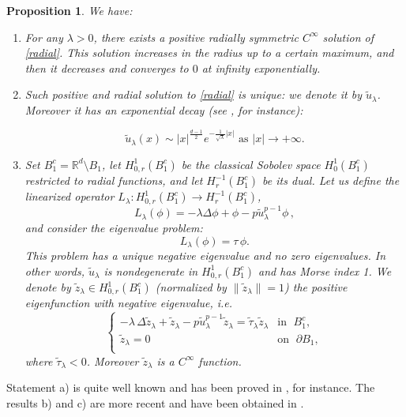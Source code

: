 \documentclass[reqno]{amsart}
\newtheorem{proposition}[theorem]{Proposition}
\numberwithin{equation}{section}
\newenvironment{key words}{\textbf{Keywords}\mbox{  }}{ }
\begin{document}
\begin{proposition} \label{list} We have:
	\begin{enumerate}
		\item[a)] For any $\lambda>0$, there exists a positive radially symmetric $C^{\infty}$ solution of \eqref{radial}. This solution increases in the radius up to a certain maximum, and then it decreases and converges to $0$ at infinity exponentially.
		\item[b)] Such positive and radial solution to \eqref{radial} is unique: we denote it by $\tilde{u}_{\lambda}$. Moreover it has an exponential decay (see \cite{strauss}, for instance):
		
		$$ \tilde{u}_{\lambda}(x) \sim |x|^{\frac{d-1}{2}} e^{- \frac{1}{\sqrt{\lambda}} |x|} \mbox{ as } |x| \to +\infty.$$
		\item[c)] Set $B_1^c = \mathbb{R}^{d}\setminus B_{1}$, let $H^1_{0,r}(B_1^c)$ be the classical Sobolev space $H^1_0(B_1^c)$ restricted to radial functions, and let $H^{-1}_{r}(B_1^c)$ be its dual. Let us define the linearized operator $L_\lambda: H^1_{0,r}(B_1^c) \to H^{-1}_{r}(B_1^c)$,
		\begin{equation}\label{linear-d}
			L_\lambda(\phi) = - \lambda \Delta \phi + \phi  - p \tilde{u}_{\lambda}^{p-1} \phi \,,
		\end{equation}
		and consider the eigenvalue problem:
		$$ L_\lambda(\phi) = \tau\, \phi.$$
		This problem has a unique negative eigenvalue and no zero eigenvalues. In other words, $\tilde{u}_{\lambda}$ is nondegenerate in $H^1_{0,r}(B_1^c)$ and has Morse index 1. We denote by $\tilde{z}_{\lambda} \in H^1_{0,r}(B_1^c)$ (normalized by $\| \tilde{z}_{\lambda} \|=1$) the positive eigenfunction with negative eigenvalue, i.e.
		\begin{equation} \label{z}
			\left\{\begin{array} {ll}
				-\lambda\, \Delta \tilde{z}_{\lambda} + \tilde{z}_{\lambda}  - p \tilde{u}_{\lambda}^{p-1} \tilde{z}_{\lambda} = \tilde{\tau}_{\lambda} \tilde{z}_{\lambda} & \mbox{in }\; B_1^c, \\
				\tilde{z}_{\lambda} = 0 & \mbox{on }\; \partial B_1, \\
			\end{array}\right.
		\end{equation}
		where $\tilde{\tau}_{\lambda}<0$. Moreover $\tilde{z}_{\lambda}$ is a $C^{\infty}$ function.
	\end{enumerate}
\end{proposition}
Statement a) is quite well known and has been proved in \cite{esteban}, for instance. The results b) and c) are more recent and have been obtained in \cite{f-m-tanaka, tang}.
\end{document}
